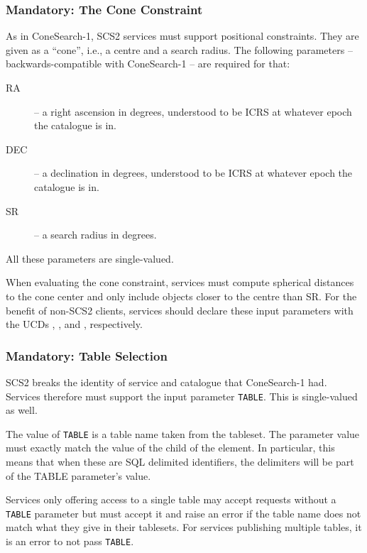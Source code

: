 \documentclass[11pt,a4paper]{ivoa}
\begin{document}
\subsubsection{Mandatory: The Cone Constraint}

As in ConeSearch-1, SCS2 services must support positional constraints.  They are
given as a ``cone'', i.e., a centre and a search radius.  The following
parameters -- backwards-compatible with ConeSearch-1 -- are required for that:

\begin{description}
\item[RA] -- a right ascension in degrees, understood to be ICRS at
whatever epoch the catalogue is in.
\item[DEC] -- a declination in degrees, understood to be ICRS at
whatever epoch the catalogue is in.
\item[SR] -- a search radius in degrees.
\end{description}

All these parameters are single-valued.

When evaluating the cone constraint, services must compute spherical
distances to the cone center and only include objects closer to the
centre than SR.  For the benefit of
non-SCS2 clients, services should declare these
input parameters with the UCDs , , and
, respectively.

\subsubsection{Mandatory: Table Selection}

SCS2 breaks the identity of service and catalogue that ConeSearch-1 had.
Services therefore must support the input parameter \verb|TABLE|.  This
is single-valued as well.

The value of \verb|TABLE| is a table name taken from the tableset. The
parameter value must exactly match the value of the  child
of the  element.  In particular, this means that when these
are SQL delimited identifiers, the delimiters will be part of the TABLE
parameter's value.

Services only offering access to a single table may accept requests without a
\verb|TABLE| parameter but must accept it and raise an error if the table name
does not match what they give in their tablesets.  For services
publishing multiple tables, it is an error to not pass \verb|TABLE|.
\end{document}
